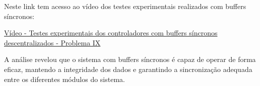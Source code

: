 \vspace{1em}

Neste link tem acesso ao vídeo dos testes experimentais realizados com buffers síncronos:

\vspace{1em}

\href{https://unlpt-my.sharepoint.com/:v:/g/personal/jafe_lopes_fct_unl_pt/EU9933Ynxy5KmcW0px4vtWABUfdrTQnUQmOR4S1zHLwRHA?e=Sr20DO}{Vídeo - Testes experimentais dos controladores com buffers síncronos descentralizados - Problema IX}

\vspace{1em}

A análise revelou que o sistema com buffers síncronos é capaz de operar de forma eficaz, mantendo a integridade dos dados e garantindo a sincronização adequada entre os diferentes módulos do sistema.


